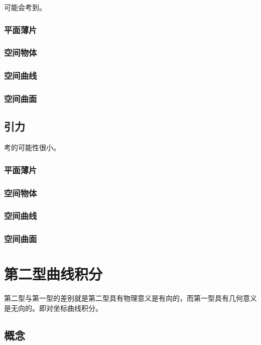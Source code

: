\documentclass[UTF8, 12pt]{ctexart}
\begin{document}
可能会考到。

\subsubsection{平面薄片}

\subsubsection{空间物体}

\subsubsection{空间曲线}

\subsubsection{空间曲面}

\subsection{引力}

考的可能性很小。

\subsubsection{平面薄片}

\subsubsection{空间物体}

\subsubsection{空间曲线}

\subsubsection{空间曲面}

\section{第二型曲线积分}

第二型与第一型的差别就是第二型具有物理意义是有向的，而第一型具有几何意义是无向的。即对坐标曲线积分。

\subsection{概念}
\end{document}
